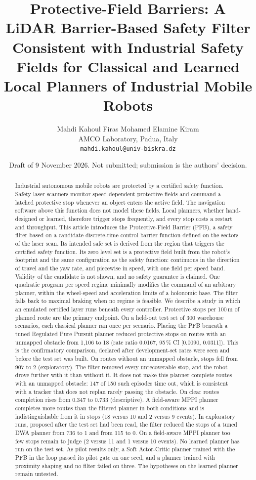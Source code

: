 \documentclass[11pt]{article}
\title{\textbf{Protective-Field Barriers: A LiDAR Barrier-Based Safety Filter Consistent with Industrial Safety Fields for Classical and Learned Local Planners of Industrial Mobile Robots}}
\author{Mahdi Kahoul \qquad Firas Mohamed Elamine Kiram\\[2pt]
\small AMCO Laboratory, Padua, Italy\\
\small \texttt{mahdi.kahoul@univ-biskra.dz}}
\date{\small Draft of 9 November 2026. Not submitted; submission is the authors' decision.}
\theoremstyle{definition}
\begin{document}
\maketitle
\thispagestyle{fancy}

\begin{abstract}
\noindent Industrial autonomous mobile robots are protected by a certified safety function. Safety laser
scanners monitor speed-dependent protective fields and command a latched protective stop whenever an
object enters the active field. The navigation software above this function does not model these fields.
Local planners, whether hand-designed or learned, therefore trigger stops frequently, and every stop costs a
restart and throughput. This article introduces the Protective-Field Barrier (PFB), a safety filter
based on a candidate discrete-time control barrier function defined on the sectors of the laser scan. Its
intended safe set is derived from the region that triggers the certified safety function. Its zero level set is a
protective field built from the robot's footprint and the same configuration as the safety function:
continuous in the direction of travel and the yaw rate, and piecewise in speed, with one field per speed band.
Validity of the candidate is not shown, and no safety guarantee is claimed. One quadratic program per speed regime
minimally modifies the command of an arbitrary planner, within the wheel-speed and acceleration limits of a
holonomic base. The filter falls back to maximal braking when no regime is feasible. We describe a study in which an
emulated certified layer runs beneath every controller. Protective stops per 100\,m of planned route are the
primary endpoint. On a held-out test set of 300 warehouse scenarios, each classical planner ran once per scenario.
Placing the PFB beneath a tuned Regulated Pure Pursuit planner reduced protective stops on routes with an unmapped
obstacle from 1{,}106 to 18 (rate ratio 0.0167, 95\,\% CI [0.0090, 0.0311]). This is the confirmatory comparison,
declared after development-set rates were seen and before the test set was built. On routes without an unmapped
obstacle, stops fell from 907 to 2 (exploratory). The filter removed every unrecoverable stop, and the robot drove
further with it than without it. It does not make this planner complete routes with an unmapped obstacle: 147 of 150
such episodes time out, which is consistent with a tracker that does not replan rarely passing the obstacle. On clear
routes completion rises from 0.347 to 0.733 (descriptive). A field-aware MPPI planner completes more routes than the
filtered planner in both conditions and is indistinguishable from it in stops (18 versus 10 and 2 versus 9 events).
In exploratory runs, proposed after the test set had been read, the filter reduced the stops of a tuned DWA planner
from 736 to 1 and from 115 to 0. On a field-aware MPPI planner too few stops remain to judge (2 versus 11 and 1
versus 10 events). No learned planner has run on the test set. As pilot results only, a Soft Actor-Critic planner
trained with the PFB in the loop passed its pilot gate on one seed, and a planner trained with proximity shaping and
no filter failed on three. The hypotheses on the learned planner remain untested.
\end{abstract}
\end{document}
